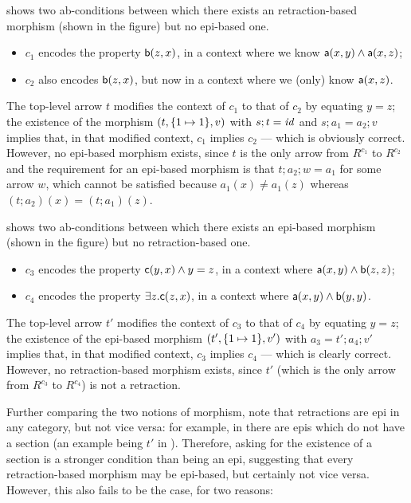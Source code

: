 \begin{example}
 shows two ab-conditions between which there exists an retraction-based morphism (shown in the figure) but no epi-based one.
\begin{itemize}
\item $c_1$ encodes the property $\mathsf{b}(z,x)$, in a context where we know $\mathsf{a}(x,y)\wedge \mathsf{a}(x,z)$;
\item $c_2$ also encodes $\mathsf{b}(z,x)$, but now in a context where we (only) know $\mathsf{a}(x,z)$.
\end{itemize}
The top-level arrow $t$ modifies the context of $c_1$ to that of $c_2$ by equating $y=z$; the existence of the morphism $(t,\{{1\mapsto 1}\},v)$ with $s;t=\mathit{id}$ and $s;a_1=a_2;v$ implies that, in that modified context, $c_1$ implies $c_2$ --- which is obviously correct. However, no epi-based morphism exists, since $t$ is the only arrow from $R^{c_1}$ to $R^{c_2}$ and the requirement for an epi-based morphism is that $t;a_2;w=a_1$ for some arrow $w$, which cannot be satisfied because $a_1(x)\neq a_1(z)$ whereas $(t;a_2)(x)=(t;a_1)(z)$.
\end{example}
%
\begin{example}
 shows two ab-conditions between which there exists an epi-based morphism (shown in the figure) but no retraction-based one.
\begin{itemize}
\item $c_3$ encodes the property $\mathsf{c}(y,x)\wedge y=z$, in a context where $\mathsf{a}(x,y)\wedge \mathsf{b}(z,z)$;
\item $c_4$ encodes the property $\exists z.\mathsf{c}(z,x)$, in a context where $\mathsf{a}(x,y)\wedge \mathsf{b}(y,y)$.
\end{itemize}
The top-level arrow $t'$ modifies the context of $c_3$ to that of $c_4$ by equating $y=z$; the existence of the epi-based morphism $(t',\{{1\mapsto 1}\},v')$ with $a_3=t';a_4;v'$ implies that, in that modified context, $c_3$ implies $c_4$ --- which is clearly correct. However, no retraction-based morphism exists, since $t'$ (which is the only arrow from $R^{c_3}$ to $R^{c_4}$) is not a retraction.
\end{example}
%
Further comparing the two notions of morphism, note that retractions are epi in any category, but not vice versa: for example, in  there are epis which do not have a section (an example being $t'$ in ). Therefore, asking for the existence of a section is a stronger condition than being an epi, suggesting that every retraction-based morphism may be epi-based, but certainly not vice versa. However, this also fails to be the case, for two reasons:
